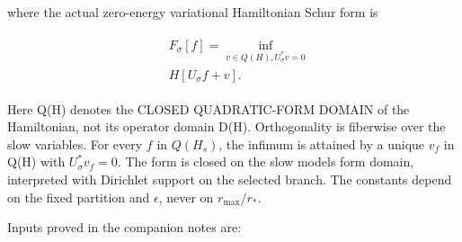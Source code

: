 where the actual zero-energy variational Hamiltonian Schur form is

\begin{gather*}
\begin{aligned}
& F_{\sigma}[f] = \inf _{v \in  Q(H), U_{\sigma}^{*}v=0} \\
& H[U_{\sigma} f+v].
\end{aligned}\tag{1.2}
\end{gather*}

Here Q(H) denotes the CLOSED QUADRATIC-FORM DOMAIN of the Hamiltonian,
not its operator domain D(H). Orthogonality is fiberwise over the slow
variables. For every \(f\) in \(Q(H_{s})\), the infimum is attained by a
unique \(v_{f}\) in Q(H) with \(U_{\sigma}^{*}v_{f}=0\). The form is
closed on the slow model\textquotesingle s form domain, interpreted with
Dirichlet support on the selected branch. The constants depend on the
fixed partition and \(\epsilon\), never on \(r_{\max}/r_{*}\).

Inputs proved in the companion notes are:

